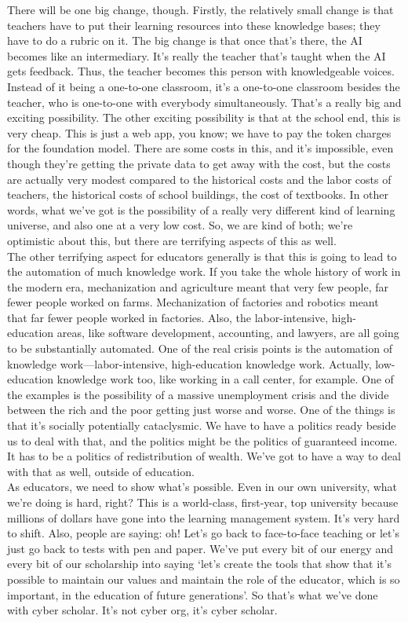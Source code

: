 \documentclass[english]{textolivre}
\begin{document}
{    There will be one big change, though. Firstly, the relatively small change is that teachers have to put their learning resources into these knowledge bases; they have to do a rubric on it. The big change is that once that’s there, the AI becomes like an intermediary. It’s really the teacher that’s taught when the AI gets feedback. Thus, the teacher becomes this person with knowledgeable voices. Instead of it being a one-to-one classroom, it’s a one-to-one classroom besides the teacher, who is one-to-one with everybody simultaneously. That’s a really big and exciting possibility. The other exciting possibility is that at the school end, this is very cheap. This is just a web app, you know; we have to pay the token charges for the foundation model. There are some costs in this, and it’s impossible, even though they’re getting the private data to get away with the cost, but the costs are actually very modest compared to the historical costs and the labor costs of teachers, the historical costs of school buildings, the cost of textbooks. In other words, what we’ve got is the possibility of a really very different kind of learning universe, and also one at a very low cost. So, we are kind of both; we’re optimistic about this, but there are terrifying aspects of this as well. \\
    The other terrifying aspect for educators generally is that this is going to lead to the automation of much knowledge work. If you take the whole history of work in the modern era, mechanization and agriculture meant that very few people, far fewer people worked on farms. Mechanization of factories and robotics meant that far fewer people worked in factories. Also, the labor-intensive, high-education areas, like software development, accounting, and lawyers, are all going to be substantially automated. One of the real crisis points is the automation of knowledge work—labor-intensive, high-education knowledge work. Actually, low-education knowledge work too, like working in a call center, for example. One of the examples is the possibility of a massive unemployment crisis and the divide between the rich and the poor getting just worse and worse. One of the things is that it’s socially potentially cataclysmic. We have to have a politics ready beside us to deal with that, and the politics might be the politics of guaranteed income. It has to be a politics of redistribution of wealth. We’ve got to have a way to deal with that as well, outside of education.\\
    As educators, we need to show what’s possible. Even in our own university, what we’re doing is hard, right? This is a world-class, first-year, top university because millions of dollars have gone into the learning management system. It’s very hard to shift. Also, people are saying: oh! Let’s go back to face-to-face teaching or let’s just go back to tests with pen and paper. We’ve put every bit of our energy and every bit of our scholarship into saying ‘let’s create the tools that show that it’s possible to maintain our values and maintain the role of the educator, which is so important, in the education of future generations’. So that’s what we’ve done with cyber scholar. It’s not cyber org, it’s cyber scholar.\\
}
\end{document}
